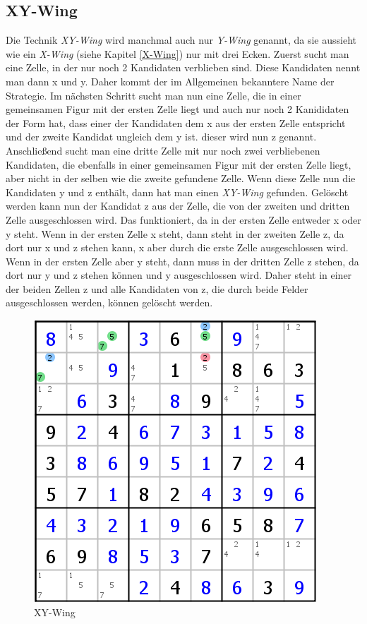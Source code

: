 \subsection{XY-Wing}
Die Technik \textit{XY-Wing} wird manchmal auch nur \textit{Y-Wing} genannt, da sie aussieht wie ein \textit{X-Wing} (siehe Kapitel \ref{X-Wing}) nur mit drei Ecken. Zuerst sucht man eine Zelle, in der nur noch 2 Kandidaten verblieben sind. Diese Kandidaten nennt man dann x und y. Daher kommt der im Allgemeinen bekanntere Name der Strategie. Im nächsten Schritt sucht man nun eine Zelle, die in einer gemeinsamen Figur mit der ersten Zelle liegt und auch nur noch 2 Kanididaten der Form hat, dass einer der Kandidaten dem x aus der ersten Zelle entspricht und der zweite Kandidat ungleich dem y ist. dieser wird nun z genannt. Anschließend sucht man eine dritte Zelle mit nur noch zwei verbliebenen Kandidaten, die ebenfalls in einer gemeinsamen Figur mit der ersten Zelle liegt, aber nicht in der selben wie die zweite gefundene Zelle. Wenn diese Zelle nun die Kandidaten y und z enthält, dann hat man einen \textit{XY-Wing} gefunden. Gelöscht werden kann nun der Kandidat z aus der Zelle, die von der zweiten und dritten Zelle ausgeschlossen wird. Das funktioniert, da in der ersten Zelle entweder x oder y steht. Wenn in der ersten Zelle x steht, dann steht in der zweiten Zelle z, da dort nur x und z stehen kann, x aber durch die erste Zelle ausgeschlossen wird. Wenn in der ersten Zelle aber y steht, dann muss in der dritten Zelle z stehen, da dort nur y und z stehen können und y ausgeschlossen wird. Daher steht in einer der beiden Zellen z und alle Kandidaten von z, die durch beide Felder ausgeschlossen werden, können gelöscht werden.

\begin{figure}[h]
\begin{center}
\includegraphics{./img/XY_Wing.png}
\caption{XY-Wing}
\end{center}
\end{figure}

